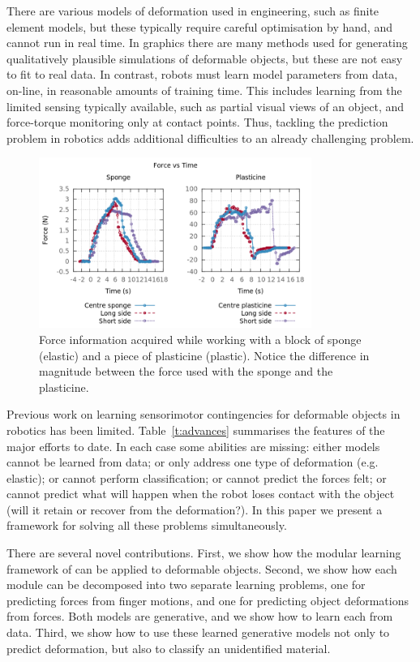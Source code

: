 \documentclass[journal]{IEEEtran}
\newcommand{\comment}[1]{{\color{red} #1}}
\begin{document}
\comment{There are various models of deformation used in engineering, such as finite element models, but these typically require careful optimisation by hand, and cannot run in real time. In graphics there are many methods used for generating qualitatively plausible simulations of deformable objects, but these are not easy to fit to real data. In contrast, robots must learn model parameters from data, on-line, in reasonable amounts of training time. This includes learning from the limited sensing typically available, such as partial visual views of an object, and force-torque monitoring only at contact points. Thus, tackling the prediction problem in robotics adds additional difficulties to an already challenging problem.}

\begin{figure}[!t]
\centering\includegraphics[width=3.5in]{arrio17.png}
\caption{Force information acquired while working with a block of sponge (elastic) and a piece of plasticine (plastic).  Notice the difference in magnitude between the force used with the sponge and the plasticine.}
\label{fig:forceElasticPlastic}
\end{figure}

\comment{Previous work on learning sensorimotor contingencies for deformable objects in robotics has been limited. Table~\ref{t:advances} summarises the features of the major efforts to date. In each case some abilities are missing: either models cannot be learned from data; or only address one type of deformation (e.g. elastic); or cannot perform classification; or cannot predict the forces felt; or cannot predict what will happen when the robot loses contact with the object (will it retain or recover from the deformation?). In this paper we present a framework for solving all these problems simultaneously. 

There are several novel contributions. First, we show how the modular learning framework of \cite{kopickiwyatt16, haruno2001mosaic} can be applied to deformable objects. Second, we show how each module can be decomposed into two separate learning problems, one for predicting forces from finger motions, and one for predicting object deformations from forces. Both models are generative, and we show how to learn each from data. Third, we show how to use these learned generative models not only to predict deformation, but also to classify an unidentified material.}
\end{document}

